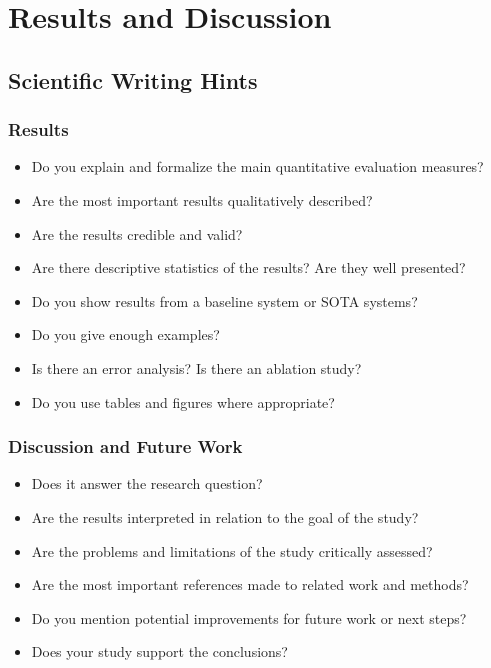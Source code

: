\documentclass[../CLthesis.tex]{subfiles}
\begin{document}
\chapter{Results and Discussion}%
\label{chap:results}

\section{Scientific Writing Hints}
\subsection{Results}
\begin{itemize}
\item Do you explain and formalize the main quantitative evaluation measures?
\item Are the most important results qualitatively described?
\item Are the results credible and valid?
\item Are there  descriptive statistics of the results? Are they well presented?
\item Do you show results from a baseline system or SOTA systems?
\item Do you give enough examples? 
\item Is there an error analysis? Is there an ablation study?
\item Do you use tables and figures where appropriate?
\end{itemize}
\subsection{Discussion and Future Work}
\begin{itemize}

\item Does it answer the research question? 
\item Are the results interpreted in relation to the goal of the study?
\item Are the problems and limitations of the study critically assessed?
\item Are the most important references made to related work and methods?
\item Do you mention potential improvements for future work or next steps?
\item Does your study support the conclusions? 

\end{itemize}
\end{document}
